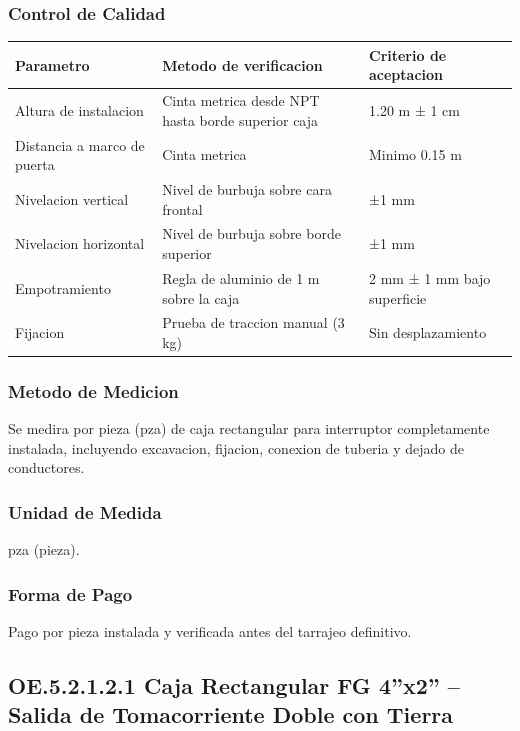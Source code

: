 \subsubsection{Control de Calidad}

\begin{longtable}{L{4.5cm} L{4.5cm} L{4.5cm}}
\toprule
\textbf{Parametro} & \textbf{Metodo de verificacion} & \textbf{Criterio de aceptacion} \\
\midrule
Altura de instalacion & Cinta metrica desde NPT hasta borde superior caja & 1.20 m ± 1 cm \\
Distancia a marco de puerta & Cinta metrica & Minimo 0.15 m \\
Nivelacion vertical & Nivel de burbuja sobre cara frontal & ±1 mm \\
Nivelacion horizontal & Nivel de burbuja sobre borde superior & ±1 mm \\
Empotramiento & Regla de aluminio de 1 m sobre la caja & 2 mm ± 1 mm bajo superficie \\
Fijacion & Prueba de traccion manual (3 kg) & Sin desplazamiento \\
\bottomrule
\end{longtable}

\subsubsection{Metodo de Medicion}

Se medira por pieza (pza) de caja rectangular para interruptor completamente instalada, incluyendo excavacion, fijacion, conexion de tuberia y dejado de conductores.

\subsubsection{Unidad de Medida}

pza (pieza).

\subsubsection{Forma de Pago}

Pago por pieza instalada y verificada antes del tarrajeo definitivo.

\subsection{OE.5.2.1.2.1 Caja Rectangular FG 4''x2'' -- Salida de Tomacorriente Doble con Tierra}

